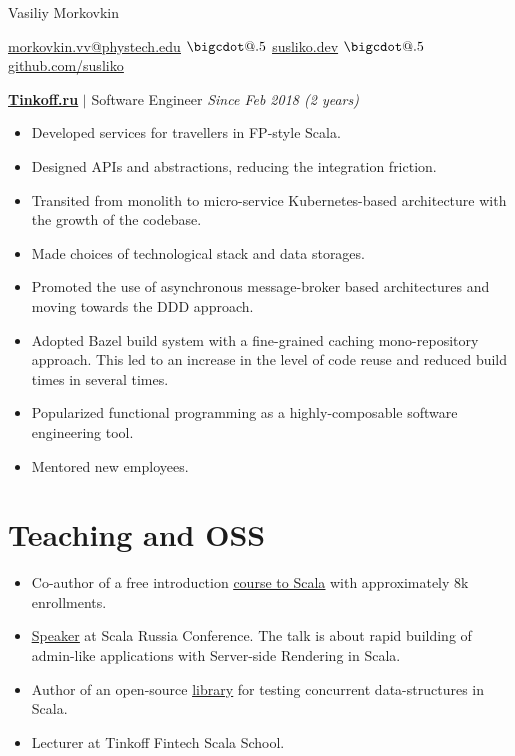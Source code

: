 \documentclass[paper=a4,fontsize=15pt]{scrartcl}
\makeatletter
\newcommand*\bigcdot{\mathpalette\bigcdot@{.5}}
\newcommand*\bigcdot@[2]{\mathbin{\vcenter{\hbox{\scalebox{#2}{$\m@th#1\bullet$}}}}}
\newcommand{\smolboispace}{\vspace*{0.1em}}
\newcommand{\halfspace}{\vspace*{0.5em}}
\newcommand{\bighalfspace}{\vspace*{0.75em}}
\newcommand{\http}[1]{\href{http://#1}{\ul{#1}}}
\newcommand{\https}[1]{\href{https://#1}{\ul{#1}}}
\newcommand{\email}[1]{\href{mailto:#1}{\ul{#1}}}
\makeatother
\begin{document}
\begin{center}
  {\fontsize{35}{40}\selectfont Vasiliy Morkovkin \par}
  \halfspace
  \smolboispace
  \smolboispace

  {\normalsize
    \email{morkovkin.vv@phystech.edu}
    $\bigcdot$ \http{susliko.dev}
    $\bigcdot$ \https{github.com/susliko}
    \par}
\end{center}

\bighalfspace
\normalsize
\noindent \href{https://www.tinkoff.ru}{\textbf{\ul{Tinkoff.ru}}}
$\vert$ \small Software Engineer
{\hfill \footnotesize \textit{Since Feb 2018 (2 years)}}
\begin{itemize}[noitemsep,leftmargin=20pt,label=\raisebox{0.25ex}{\tiny$\bullet$},topsep=5pt]
  \small
  \item Developed services for travellers in FP-style Scala.
  \item Designed APIs and abstractions, reducing the integration friction.
  \item Transited from monolith to micro-service Kubernetes-based architecture with the growth of the codebase.
  \item Made choices of technological stack and data storages.
  \item Promoted the use of asynchronous message-broker based architectures and moving towards the DDD approach.
  \item Adopted Bazel build system with a fine-grained caching mono-repository approach. This led to an increase in the level of code reuse and reduced build times in several times.
  \item Popularized functional programming as a highly-composable software engineering tool.
  \item Mentored new employees.
\end{itemize}

\section*{Teaching and OSS}{}
\begin{itemize}[noitemsep,leftmargin=20pt,label=\raisebox{0.25ex}{\tiny$\bullet$},topsep=5pt]
  \item Co-author of a free introduction \href{https://stepik.org/course/16243}{\ul{course to Scala}} with approximately 8k enrollments.
  \item \href{https://www.youtube.com/watch?v=8KxWi0xuDKs&t=15s}{\ul{Speaker}} at Scala Russia Conference. The talk is about rapid building of admin-like applications with Server-side Rendering in Scala.
  \item Author of an open-source \href{https://github.com/susliko/lotos}{\ul{library}} for testing concurrent data-structures in Scala.
  \item Lecturer at Tinkoff Fintech Scala School.
\end{itemize}
\end{document}
